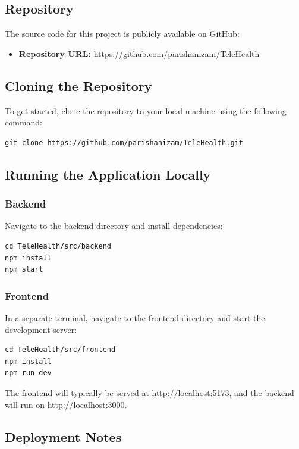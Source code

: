 \documentclass{article}
\begin{document}
\subsection{Repository}
The source code for this project is publicly available on GitHub:
\begin{itemize}
    \item \textbf{Repository URL:} \url{https://github.com/parishanizam/TeleHealth}
\end{itemize}

\subsection{Cloning the Repository}
To get started, clone the repository to your local machine using the following command:

\begin{verbatim}
git clone https://github.com/parishanizam/TeleHealth.git
\end{verbatim}

\subsection{Running the Application Locally}

\subsubsection{Backend}
Navigate to the backend directory and install dependencies:

\begin{verbatim}
cd TeleHealth/src/backend
npm install
npm start
\end{verbatim}

\subsubsection{Frontend}
In a separate terminal, navigate to the frontend directory and start the development server:

\begin{verbatim}
cd TeleHealth/src/frontend
npm install
npm run dev
\end{verbatim}

The frontend will typically be served at \url{http://localhost:5173}, and the backend will run on \url{http://localhost:3000}.

\subsection{Deployment Notes}
\end{document}
